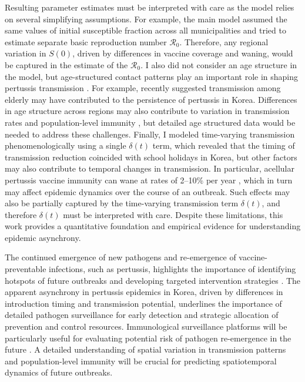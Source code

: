 \documentclass[12pt]{article}
\begin{document}
Resulting parameter estimates must be interpreted with care as the model relies on several simplifying assumptions.
For example, the main model assumed the same values of initial susceptible fraction across all municipalities and tried to estimate separate basic reproduction number $\mathcal R_0$.
Therefore, any regional variation in $S(0)$, driven by differences in vaccine coverage and waning, would be captured in the estimate of the $\mathcal R_0$.
I also did not consider an age structure in the model, but age-structured contact patterns play an important role in shaping pertussis transmission \citep{rohani2010contact}.
For example, \cite{cho2024pertussis} recently suggested transmission among elderly may have contributed to the persistence of pertussis in Korea.
Differences in age structure across regions may also contribute to variation in transmission rates and population-level immunity \citep{britton2020mathematical}, but detailed age structured data would be needed to address these challenges.
Finally, I modeled time-varying transmission phenomenologically using a single $\delta(t)$ term, which revealed that the timing of transmission reduction coincided with school holidays in Korea, but other factors may also contribute to temporal changes in transmission.
In particular, acellular pertussis vaccine immunity can wane at rates of 2--10\% per year \citep{gambhir2015change,domenech2019duration,chit2018acellular}, which in turn may affect epidemic dynamics over the course of an outbreak.
Such effects may also be partially captured by the time-varying transmission term $\delta(t)$, and therefore $\delta(t)$ must be interpreted with care.
Despite these limitations, this work provides a quantitative foundation and empirical evidence for understanding epidemic asynchrony.

The continued emergence of new pathogens and re-emergence of vaccine-preventable infections, such as pertussis, highlights the importance of identifying hotspots of future outbreaks and developing targeted intervention strategies \citep{heymann2001hot,naguib2020towards,nguyen2022enterovirus}.
The apparent asynchrony in pertussis epidemics in Korea, driven by differences in introduction timing and transmission potential, underlines the importance of detailed pathogen surveillance for early detection and strategic allocation of prevention and control resources.
Immunological surveillance platforms will be particularly useful for evaluating potential risk of pathogen re-emergence in the future \citep{mina2020global,nguyen2022enterovirus,nguyen2026dynamics}.
A detailed understanding of spatial variation in transmission patterns and population-level immunity will be crucial for predicting spatiotemporal dynamics of future outbreaks.
\end{document}
